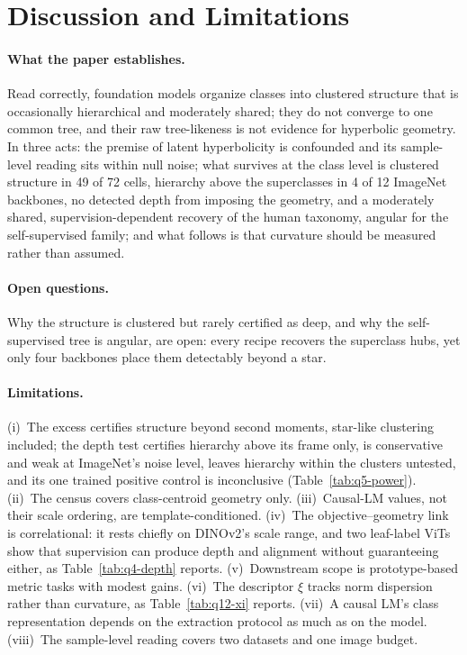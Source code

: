 \documentclass{article}
\begin{document}
\section{Discussion and Limitations}
\label{sec:discussion}

\paragraph{What the paper establishes.} Read correctly, foundation models organize classes into clustered structure that is occasionally hierarchical and moderately shared; they do not converge to one common tree, and their raw tree-likeness is not evidence for hyperbolic geometry. In three acts: the premise of latent hyperbolicity is confounded and its sample-level reading sits within null noise; what survives at the class level is clustered structure in 49 of 72 cells, hierarchy above the superclasses in 4 of 12 ImageNet backbones, no detected depth from imposing the geometry, and a moderately shared, supervision-dependent recovery of the human taxonomy, angular for the self-supervised family; and what follows is that curvature should be measured rather than assumed.

\paragraph{Open questions.} Why the structure is clustered but rarely certified as deep, and why the self-supervised tree is angular, are open: every recipe recovers the superclass hubs, yet only four backbones place them detectably beyond a star.

\paragraph{Limitations.} (i)~The excess certifies structure beyond second moments, star-like clustering included; the depth test certifies hierarchy above its frame only, is conservative and weak at ImageNet's noise level, leaves hierarchy within the clusters untested, and its one trained positive control is inconclusive (Table~\ref{tab:q5-power}). (ii)~The census covers class-centroid geometry only. (iii)~Causal-LM values, not their scale ordering, are template-conditioned. (iv)~The objective--geometry link is correlational: it rests chiefly on DINOv2's scale range, and two leaf-label ViTs show that supervision can produce depth and alignment without guaranteeing either, as Table~\ref{tab:q4-depth} reports. (v)~Downstream scope is prototype-based metric tasks with modest gains. (vi)~The descriptor $\xi$ tracks norm dispersion rather than curvature, as Table~\ref{tab:q12-xi} reports. (vii)~A causal LM's class representation depends on the extraction protocol as much as on the model. (viii)~The sample-level reading covers two datasets and one image budget.
\end{document}
